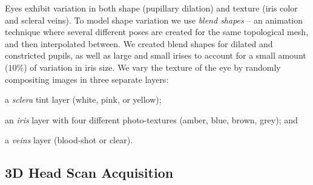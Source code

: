 Eyes exhibit variation in both shape (pupillary dilation) and texture (iris color and scleral veins).
To model shape variation we use \emph{blend shapes} -- an animation technique where several different poses are created for the same topological mesh, and then interpolated between\cite{orvalho2012facial}. 
We created blend shapes for dilated and constricted pupils, as well as large and small irises to account for a small amount ($10\%$) of variation in iris size.
We vary the texture of the eye by randomly compositing images in three separate layers:
\begin{inparaenum}
\item a \emph{sclera} tint layer (white, pink, or yellow);
\item an \emph{iris} layer with four different photo-textures (amber, blue, brown, grey); and
\item a \emph{veins} layer (blood-shot or clear).
\end{inparaenum}

\subsection{3D Head Scan Acquisition}
\label{sec:eye_region_geom_prep}

